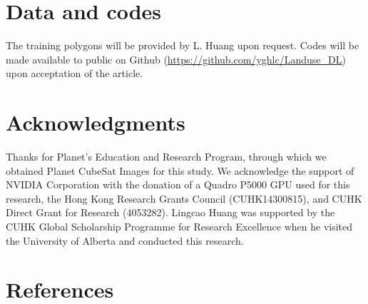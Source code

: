 \documentclass[preprint,12pt,authoryear]{elsarticle}
\begin{document}
\section{Data and codes}
\label{sec_data_codes}

The training polygons will be provided by L. Huang upon request. 
Codes will be made available to public on Github (\url{https://github.com/yghlc/Landuse\_DL}) upon acceptation of the article. 


\section{Acknowledgments}
\label{sec_acknowledgments}

Thanks for Planet’s Education and Research Program, through which we obtained Planet CubeSat Images for this study. We acknowledge the support of NVIDIA Corporation with the donation of a Quadro P5000 GPU used for this research, the Hong Kong Research Grants Council (CUHK14300815), and CUHK Direct Grant for Research (4053282). Lingcao Huang was supported by the CUHK Global Scholarship Programme for Research Excellence when he visited the University of Alberta and conducted this research.





\section{References}
\label{sec_reference}

 



%
%
\end{document}
